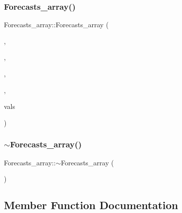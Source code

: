 \mbox{\label{class_forecasts__array_ac50579e66269d92ebdbc4dc1ea07f7c8}} 
\subsubsection{\texorpdfstring{Forecasts\+\_\+array()}{Forecasts\_array()}\hspace{0.1cm}{\footnotesize\ttfamily [4/4]}}
{\footnotesize\ttfamily Forecasts\+\_\+array\+::\+Forecasts\+\_\+array (\begin{DoxyParamCaption}\item[{\mbox{\hyperlink{classanen_par_1_1_parameters}{anen\+Par\+::\+Parameters}}}]{,  }\item[{\mbox{\hyperlink{classanen_sta_1_1_stations}{anen\+Sta\+::\+Stations}}}]{,  }\item[{\mbox{\hyperlink{classanen_time_1_1_times}{anen\+Time\+::\+Times}}}]{,  }\item[{\mbox{\hyperlink{classanen_time_1_1_f_l_ts}{anen\+Time\+::\+F\+L\+Ts}}}]{,  }\item[{const std\+::vector$<$ double $>$ \&}]{vals }\end{DoxyParamCaption})}

\mbox{\label{class_forecasts__array_a7e13cb82b1ab76a45946cff992c7fff4}} 
\subsubsection{\texorpdfstring{$\sim$\+Forecasts\+\_\+array()}{~Forecasts\_array()}}
{\footnotesize\ttfamily Forecasts\+\_\+array\+::$\sim$\+Forecasts\+\_\+array (\begin{DoxyParamCaption}{ }\end{DoxyParamCaption})\hspace{0.3cm}{\ttfamily [virtual]}}



\subsection{Member Function Documentation}
\mbox{\label{class_forecasts__array_ae7af8dfc4b7a7970310d06bf71069200}} 
